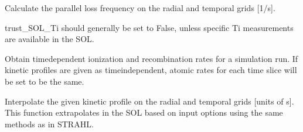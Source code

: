 \documentclass[letterpaper,10pt,english]{sphinxmanual}
\begin{document}
\begin{fulllineitems}
\begin{fulllineitems}
\end{fulllineitems}


\begin{fulllineitems}
\label{\detokenize{aurora:aurora.core.aurora_sim.get_par_loss_rate}}
Calculate the parallel loss frequency on the radial and temporal grids {[}1/s{]}.

trust\_SOL\_Ti should generally be set to False, unless specific Ti measurements are available
in the SOL.

\end{fulllineitems}


\begin{fulllineitems}
\label{\detokenize{aurora:aurora.core.aurora_sim.get_time_dept_atomic_rates}}
Obtain time\sphinxhyphen{}dependent ionization and recombination rates for a simulation run.
If kinetic profiles are given as time\sphinxhyphen{}independent, atomic rates for each time slice
will be set to be the same.

\end{fulllineitems}


\begin{fulllineitems}
\label{\detokenize{aurora:aurora.core.aurora_sim.interp_kin_prof}}
Interpolate the given kinetic profile on the radial and temporal grids {[}units of s{]}.
This function extrapolates in the SOL based on input options using the same methods as in STRAHL.

\end{fulllineitems}



\end{fulllineitems}
\end{document}
